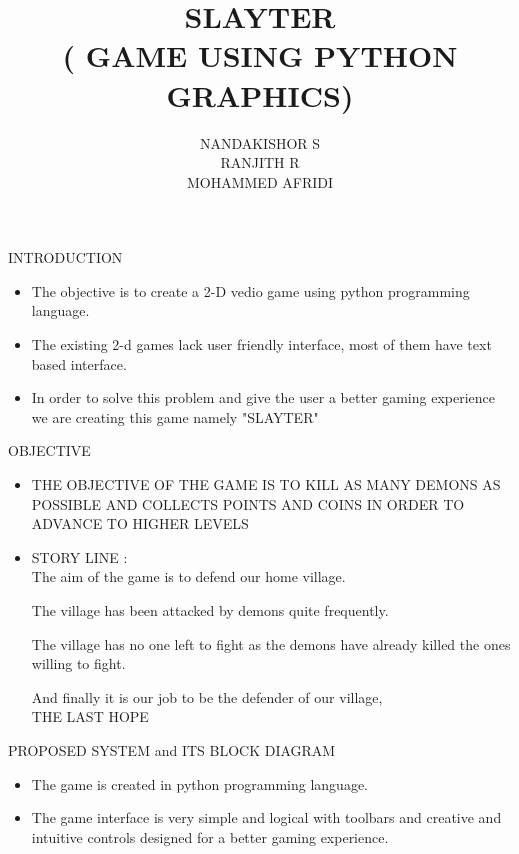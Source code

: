 \documentclass[11pt]{beamer}
\author{NANDAKISHOR S\\RANJITH R\\MOHAMMED AFRIDI}
\title{SLAYTER\\	( GAME USING PYTHON  GRAPHICS)}
\begin{document}
\begin{frame}
\titlepage
\end{frame}


\begin{frame}{INTRODUCTION}
\begin{itemize}
\item The objective is to create a 2-D vedio game using python programming language.
\item The existing 2-d games lack user friendly interface, most of them have text based interface.
\item In order to solve this problem and give the user a better gaming experience we are creating this game namely "SLAYTER"

\end{itemize}

\end{frame}

\begin{frame}{OBJECTIVE}
\begin{itemize}
\item THE OBJECTIVE OF THE GAME IS TO KILL AS MANY DEMONS AS POSSIBLE AND COLLECTS POINTS AND COINS IN ORDER TO ADVANCE TO HIGHER LEVELS

 
\item STORY LINE : \\
The aim of the game is to defend our home village.

The village has been attacked by demons quite frequently.

The village has no one left to fight as the demons have already killed the ones willing to fight.

And finally it is our job to be the defender of our village,\\THE LAST HOPE 

\end{itemize}

\end{frame}

\begin{frame}{PROPOSED SYSTEM and ITS BLOCK DIAGRAM}
\begin{itemize}
\item The game is created in python programming language.
\item The game interface is very simple and logical with toolbars and creative and intuitive controls designed for a better gaming experience.
\end{itemize}
\end{frame}
\end{document}
